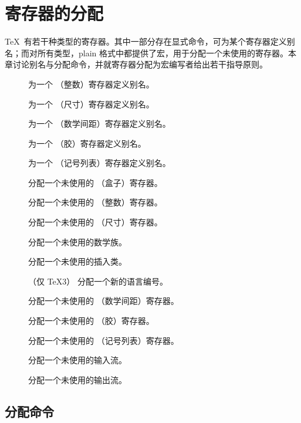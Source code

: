 \documentclass[a4paper]{rapport3}
\newenvironment{inventory}{\begin{description}}{\end{description}}
\begin{document}

\endofchapter
\chapter{寄存器的分配}\label{alloc}

\TeX\ 有若干种类型的寄存器。其中一部分存在显式命令，可为某个寄存器定义别名；而对所有类型，plain 格式中都提供了宏，用于分配一个未使用的寄存器。本章讨论别名与分配命令，并就寄存器分配为宏编写者给出若干指导原则。

\begin{inventory}
\item [] 
      为一个 （整数）寄存器定义别名。
\item []
      为一个 （尺寸）寄存器定义别名。
\item []
      为一个 （数学间距）寄存器定义别名。
\item [] 
      为一个 （胶）寄存器定义别名。
\item [] 
      为一个 （记号列表）寄存器定义别名。
\item []
      分配一个未使用的 （盒子）寄存器。
\item []
      分配一个未使用的 （整数）寄存器。
\item []
      分配一个未使用的 （尺寸）寄存器。
\item []
      分配一个未使用的数学族。
\item []
      分配一个未使用的插入类。
\item []
      （仅 \TeX3）
      分配一个新的语言编号。
\item []
      分配一个未使用的 （数学间距）寄存器。
\item []
      分配一个未使用的 （胶）寄存器。
\item []
      分配一个未使用的 （记号列表）寄存器。
\item []
      分配一个未使用的输入流。
\item []
      分配一个未使用的输出流。
\end{inventory}

\section{分配命令}
\end{document}
